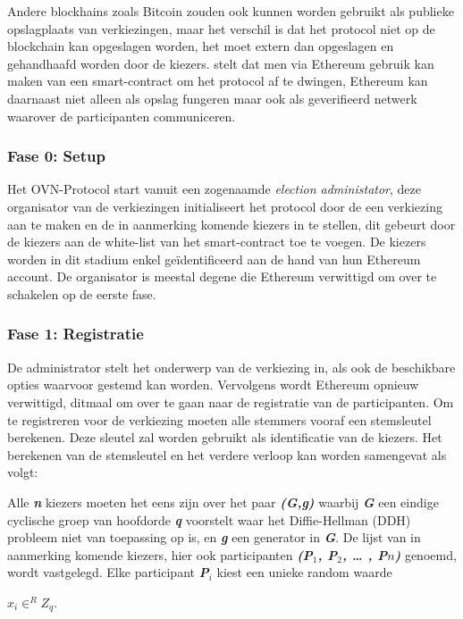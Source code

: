 			Andere blockhains zoals Bitcoin zouden ook kunnen worden gebruikt als publieke opslagplaats van verkiezingen, maar het verschil is dat het protocol niet op de blockchain kan opgeslagen worden, het moet extern dan opgeslagen en gehandhaafd worden door de kiezers. \textcite{McCorry2017} stelt dat men via Ethereum gebruik kan maken van een smart-contract om  het protocol af te dwingen, Ethereum kan daarnaast niet alleen als opslag fungeren maar ook als geverifieerd netwerk waarover de participanten communiceren.
		\subsubsection*{Fase 0: Setup }
			Het OVN-Protocol start vanuit een zogenaamde \textit{election administator}, deze organisator van de verkiezingen initialiseert het protocol door de een verkiezing aan te maken en de in aanmerking komende kiezers in te stellen, dit gebeurt door de kiezers aan de white-list van het smart-contract toe te voegen. De kiezers worden in dit stadium enkel geïdentificeerd aan de hand van hun Ethereum account. De organisator is meestal degene die  Ethereum verwittigd om over te schakelen op de eerste fase.
		\subsubsection*{Fase 1: Registratie }
			De administrator stelt het onderwerp van de verkiezing in, als ook de beschikbare opties waarvoor gestemd kan worden. Vervolgens wordt Ethereum opnieuw verwittigd, ditmaal om over te gaan naar de registratie van de participanten. Om te registreren voor de verkiezing moeten alle stemmers vooraf een stemsleutel berekenen. Deze sleutel zal worden gebruikt als identificatie van de kiezers. Het berekenen  van de stemsleutel en het verdere verloop kan worden samengevat als volgt: 
			
			Alle \textbf{\textit{n}} kiezers moeten het eens zijn over het paar \textbf{\textit{(G,g)}} waarbij \textbf{\textit{G}} een eindige cyclische groep van hoofdorde \textbf{\textit{q}} voorstelt waar het Diffie-Hellman (DDH) probleem niet van toepassing op is, en \textbf{\textit{g}} een generator in \textbf{\textit{G}}. De lijst van in aanmerking komende kiezers, hier ook participanten \textbf{\textit{(P$_{1}$, P$_{2}$, … , P${n}$)}} genoemd, wordt vastgelegd. Elke participant \textbf{\textit{P$_{i}$}} kiest een unieke random waarde  
			
			\textbf{\textit{$x_{i} \in^{R} Z_{q}$}}.
			
